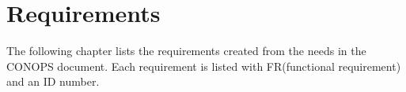 \chapter{Requirements}
The following chapter lists the requirements created from the needs in the CONOPS document. Each requirement is listed with FR(functional requirement) and an ID number. 







